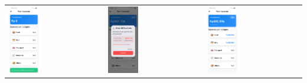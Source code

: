 \begin{tabular}{lll}
    \\
    \includegraphics[width=0.33\textwidth]{images/UI/expense-0.jpg} &
    \includegraphics[width=0.33\textwidth]{images/UI/expense-clear.jpg} &
    \includegraphics[width=0.33\textwidth]{images/UI/expense.jpg} \\
\end{tabular}

